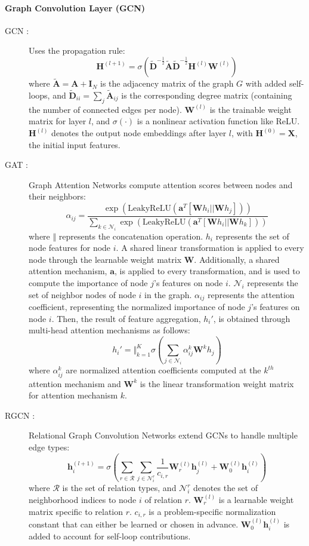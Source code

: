 \documentclass{article}
\begin{document}
\paragraph{Graph Convolution Layer (GCN)}
\begin{description}
  \item[GCN \cite{gcn}:] Uses the propagation rule: 
  \[
  \mathbf{H}^{(l+1)} = \sigma\left( \tilde{\mathbf{D}}^{-\frac{1}{2}} \tilde{\mathbf{A}} \tilde{\mathbf{D}}^{-\frac{1}{2}} \mathbf{H}^{(l)} \mathbf{W}^{(l)} \right)
  \]
  where $\tilde{\mathbf{A}} = \mathbf{A} + \mathbf{I}_N$ is the adjacency matrix of the graph $G$ with added self-loops, and $\tilde{\mathbf{D}}_{ii} = \sum_j \tilde{\mathbf{A}}_{ij}$ is the corresponding degree matrix (containing the number of connected edges per node). $\mathbf{W}^{(l)}$ is the trainable weight matrix for layer $l$, and $\sigma(\cdot)$ is a nonlinear activation function like ReLU. $\mathbf{H}^{(l)}$ denotes the output node embeddings after layer $l$, with $\mathbf{H}^{(0)} = \mathbf{X}$, the initial input features.

  \item[GAT \cite{gat}:] Graph Attention Networks compute attention scores between nodes and their neighbors:
  \[
    \alpha_{ij} = \frac{\exp(\text{LeakyReLU}(\textbf{a}^T[\mathbf{W}h_i || \mathbf{W}h_j]))}{\sum_{k \in \mathcal{N}_i} \exp(\text{LeakyReLU}(\textbf{a}^T[\mathbf{W}h_i || \mathbf{W}h_k]))}
  \]
  where $\big\Vert$ represents the concatenation operation. $h_i$ represents the set of node features for node $i$. A shared linear transformation is applied to every node through the learnable weight matrix $\textbf{W}$. Additionally, a shared attention mechanism, $\textbf{a}$, is applied to every transformation, and is used to compute the importance of node $j$'s features on node $i$. $\mathcal{N}_i$ represents the set of neighbor nodes of node $i$ in the graph. $\alpha_{ij}$ represents the attention coefficient, representing the normalized importance of node $j$'s features on node $i$. Then, the result of feature aggregation, $h_i'$, is obtained through multi-head attention mechanisms as follows:
  \[
    h_{i}' = \big\Vert_{k=1}^K \sigma(\sum_{j \in \mathcal{N}_i} \alpha_{ij}^k \textbf{W}^k h_j)
  \]
  where $\alpha_{ij}^k$ are normalized attention coefficients computed at the $k^{th}$ attention mechanism and $\mathbf{W}^k$ is the linear transformation weight matrix for attention mechanism $k$.


  \item[RGCN \cite{rgcn}:] Relational Graph Convolution Networks extend GCNs to handle multiple edge types:
  \[
  \mathbf{h}_i^{(l+1)} = \sigma\left( \sum_{r \in \mathcal{R}} \sum_{j \in \mathcal{N}_i^r} \frac{1}{c_{i,r}} \mathbf{W}_r^{(l)} \mathbf{h}_j^{(l)} + \mathbf{W}_0^{(l)} \mathbf{h}_i^{(l)} \right)
  \]
  where $\mathcal{R}$ is the set of relation types, and $\mathcal{N}_i^r$ denotes the set of neighborhood indices to node $i$ of relation $r$. $\mathbf{W}_r^{(l)}$ is a learnable weight matrix specific to relation $r$. $c_{i, r}$ is a problem-specific normalization constant that can either be learned or chosen in advance. $\mathbf{W}_0^{(l)} \mathbf{h}_i^{(l)}$ is added to account for self-loop contributions.


\end{description}
\end{document}
